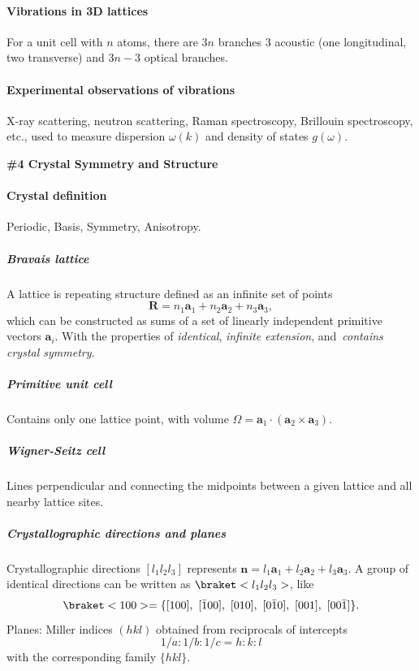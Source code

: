 \paragraph{Vibrations in 3D lattices}

For a unit cell with $n$ atoms, there are $3n$ branches
$3$ acoustic (one longitudinal, two transverse) and $3n - 3$ optical branches.

\paragraph{Experimental observations of vibrations}

X-ray scattering, neutron scattering, Raman spectroscopy, Brillouin
spectroscopy, etc., used to measure dispersion $\omega(k)$ and density of
states $g(\omega)$.

\begin{framed}\large\bfseries
  \#4 Crystal Symmetry and Structure
\end{framed}

\paragraph{Crystal definition}

Periodic, Basis, Symmetry, Anisotropy.

\subparagraph{Bravais lattice}

A lattice is repeating structure defined as an infinite set of points
\[
  \bm R = n_1\bm a_1 + n_2\bm a_2 + n_3\bm a_3,
\]
which can be constructed as sums of a set of linearly independent
primitive vectors $\bm a_i$. With the properties of
\emph{identical}, \emph{infinite extension},
and~\emph{contains crystal symmetry}.

\subparagraph{Primitive unit cell}

Contains only one lattice point, with
volume $\Omega = \bm a_1 \cdot (\bm a_2 \times \bm a_3)$.

\subparagraph{Wigner-Seitz cell}

Lines perpendicular and connecting the midpoints between a given lattice and all
nearby lattice sites.

\subparagraph{Crystallographic directions and planes}

Crystallographic directions $[l_1 l_2 l_3]$
represents $\bm n = l_1\bm a_1 + l_2\bm a_2 + l_3\bm a_3$.
A group of identical directions can be written as $\braket<l_1 l_2 l_3>$, like
\[
  \braket<100> = \{[100],\ [\bar100],\ [010],\ [0\bar10],\ [001],\ [00\bar1]\}.
\]
Planes: Miller indices $(hkl)$ obtained from reciprocals of intercepts
\[
  1/a:1/b:1/c = h:k:l
\]
with the corresponding family $\{hkl\}$.

